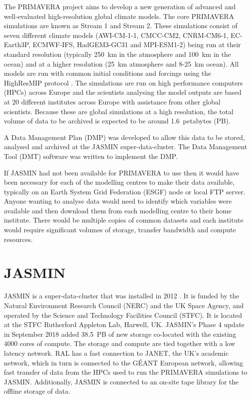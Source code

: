 \documentclass[gmd, manuscript]{copernicus}
\begin{document}


\introduction  %

The PRIMAVERA project aims to develop a new generation of advanced and well-evaluated high-resolution global climate models. The core PRIMAVERA simulations are known as Stream 1 and Stream 2. These simulations consist of seven different climate models (AWI-CM-1-1, CMCC-CM2, CNRM-CM6-1, EC-Earth3P, ECMWF-IFS, HadGEM3-GC31 and MPI-ESM1-2) being run at their standard resolution (typically  250~km in the atmosphere and 100~km in the ocean) and at a higher resolution (25~km atmosphere and 8-25~km ocean). All models are run with common initial conditions and forcings using the HighResMIP protocol \citep{Haarsma2016}. The simulations are run on high performance computers (HPCs) across Europe and the scientists analysing the model outputs are based at 20 different institutes across Europe with assistance from other global scientists. Because these are global simulations at a high resolution, the total volume of data to be archived is expected to be around 1.6~petabytes (PB).

A Data Management Plan (DMP) was developed to allow this data to be stored, analysed and archived at the JASMIN super-data-cluster. The Data Management Tool (DMT) software was written to implement the DMP.

If JASMIN had not been available for PRIMAVERA to use then it would have been necessary for each of the modelling centres to make their data available, typically on an Earth System Grid Federation (ESGF) node or local FTP server. Anyone wanting to analyse data would need to identify which variables were available and then download them from each modelling centre to their home institute. There would be multiple copies of common datasets and each institute would require significant volumes of storage, transfer bandwidth and compute resources.

\section{JASMIN}

JASMIN is a super-data-cluster that was installed in 2012 \citep{lawrence2013storing}. It is funded by the Natural Environment Research Council (NERC) and the UK Space Agency, and operated by the Science and Technology Facilities Council (STFC). It is located at the STFC Rutherford Appleton Lab, Harwell, UK. JASMIN's Phase 4 update in September 2018 added 38.5~PB of new storage co-located with the existing 4000 cores of compute. The storage and compute are tied together with a low latency network. RAL has a fast connection to JANET, the UK's academic network, which in turn is connected to the G\'{E}ANT European network, allowing fast transfer of data from the HPCs used to run the PRIMAVERA simulations to JASMIN. Additionally, JASMIN is connected to an on-site tape library for the offline storage of data.
\end{document}
